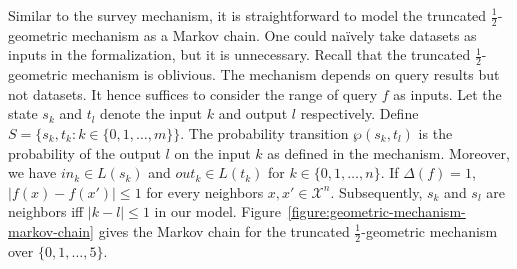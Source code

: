 Similar to the survey mechanism, it is straightforward to model the
truncated $\frac{1}{2}$-geometric mechanism as a Markov chain. 
One could na\"ively take datasets as inputs in the formalization, but
it is unnecessary.
Recall that the truncated $\frac{1}{2}$-geometric mechanism is
oblivious. The mechanism depends on query results but not
datasets. It hence suffices to consider the range of query $f$
as inputs.
Let the state $s_k$ and $t_l$
denote the input $k$ and output $l$ respectively. Define
$S = \{ s_k, t_k : k \in \{ 0, 1, \ldots, m \} \}$.
The probability transition $\wp (s_k, t_l)$ is the probability of the
output $l$ on the input $k$ as defined in the
mechanism. Moreover, we have $\mathit{in}_k \in L (s_k)$ and
$\mathit{out}_k \in L (t_k)$ for $k \in \{ 0, 1, \ldots, n \}$.
If $\Delta (f) = 1$, $| f (x) - f (x') | \leq 1$ for every neighbors
$x, x' \in \mathcal{X}^n$. Subsequently, $s_k$ and $s_l$ are
neighbors iff $| k - l | \leq 1$ in our model.
Figure~\ref{figure:geometric-mechanism-markov-chain} gives
the Markov chain for the truncated
$\frac{1}{2}$-geometric mechanism over $\{ 0, 1, \ldots, 5 \}$.

